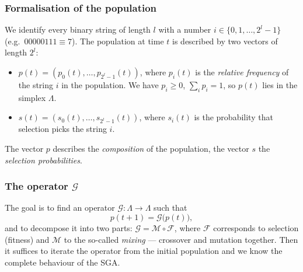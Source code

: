 \documentclass[11pt,a4paper]{article}
\theoremstyle{definition}
\begin{document}
\subsubsection{Formalisation of the population}

We identify every binary string of length $l$ with a number
$i \in \{0,1,\dots,2^l-1\}$ (e.g.\ $00000111 \equiv 7$). The population at time
$t$ is described by two vectors of length $2^l$:

\begin{defbox}
\begin{itemize}
\item $p(t) = (p_0(t),\dots,p_{2^l-1}(t))$, where $p_i(t)$ is the
  \emph{relative frequency} of the string $i$ in the population. We have
  $p_i \ge 0$, $\sum_i p_i = 1$, so $p(t)$ lies in the simplex $\Lambda$.
\item $s(t) = (s_0(t),\dots,s_{2^l-1}(t))$, where $s_i(t)$ is the probability
  that selection picks the string $i$.
\end{itemize}
The vector $p$ describes the \emph{composition} of the population, the vector
$s$ the \emph{selection probabilities}.
\end{defbox}

\subsubsection{The operator $\mathcal{G}$}

The goal is to find an operator $\mathcal{G}: \Lambda \to \Lambda$ such that
\[
p(t+1) = \mathcal{G}\big(p(t)\big),
\]
and to decompose it into two parts: $\mathcal{G} = \mathcal{M} \circ
\mathcal{F}$, where $\mathcal{F}$ corresponds to selection (fitness) and
$\mathcal{M}$ to the so-called \emph{mixing} --- crossover and mutation
together. Then it suffices to iterate the operator from the initial population
and we know the complete behaviour of the SGA.
\end{document}
